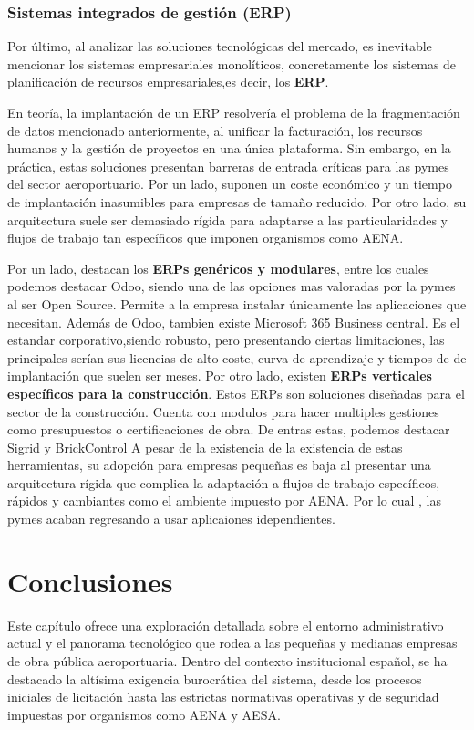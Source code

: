 \subsubsection{Sistemas integrados de gestión (ERP)}
Por último, al analizar las soluciones tecnológicas del mercado, es inevitable mencionar los sistemas empresariales monolíticos, concretamente los sistemas de planificación de recursos empresariales,es decir, los \textbf{ERP}. 

En teoría, la implantación de un ERP resolvería el problema de la fragmentación de datos mencionado anteriormente, al unificar la facturación, los recursos humanos y la gestión de proyectos en una única plataforma. Sin embargo, en la práctica, estas soluciones presentan barreras de entrada críticas para las pymes del sector aeroportuario. Por un lado, suponen un coste económico y un tiempo de implantación inasumibles para empresas de tamaño reducido. Por otro lado, su arquitectura suele ser demasiado rígida para adaptarse a las particularidades y flujos de trabajo tan específicos que imponen organismos como AENA.

Por un lado, destacan los \textbf{ERPs genéricos y modulares}, entre los cuales podemos destacar Odoo, siendo una de las opciones mas valoradas por la pymes al ser Open Source. Permite a la empresa instalar únicamente las aplicaciones que necesitan. Además de Odoo, tambien existe Microsoft 365 Business central. Es el estandar corporativo,siendo robusto, pero presentando ciertas limitaciones, las principales serían sus licencias de alto coste, curva de aprendizaje y tiempos de de implantación que suelen ser meses.
Por otro lado, existen \textbf{ERPs verticales específicos para la construcción}. Estos ERPs son soluciones diseñadas para el sector de la construcción. Cuenta con modulos para hacer multiples gestiones como presupuestos o certificaciones de obra. De entras estas, podemos destacar Sigrid y BrickControl
A pesar de la existencia de la existencia de estas herramientas, su adopción para empresas pequeñas es baja al presentar una arquitectura rígida que complica la adaptación a flujos de trabajo específicos, rápidos y cambiantes como el ambiente impuesto por AENA. Por lo cual , las pymes acaban regresando a usar aplicaiones idependientes.
\section{Conclusiones}

Este capítulo ofrece una exploración detallada sobre el entorno administrativo actual y el panorama tecnológico que rodea a las pequeñas y medianas empresas de obra pública aeroportuaria. Dentro del contexto institucional español, se ha destacado la altísima exigencia burocrática del sistema, desde los procesos iniciales de licitación hasta las estrictas normativas operativas y de seguridad impuestas por organismos como AENA y AESA.

